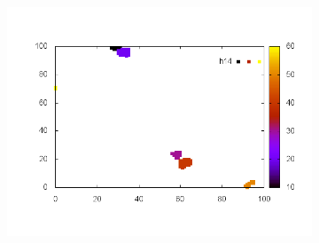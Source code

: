 \documentclass[10pt,a4paper]{article}
\begin{document}
\begin{figure}
\begin{subfigure}[b]{1\textwidth}
\includegraphics[scale=.3]{./img/SCC_Stable3/cut95p/14.png}
\end{subfigure}


\end{figure}
\end{document}
